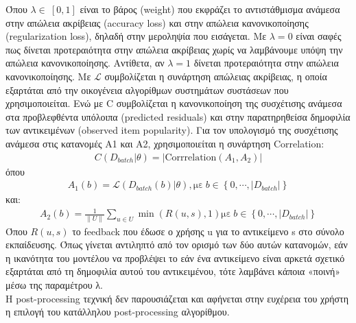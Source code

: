Όπου $ λ \in\ [0,1] $ είναι το βάρος (weight) που εκφράζει το αντιστάθμισμα ανάμεσα στην απώλεια ακρίβειας (accuracy loss) και στην απώλεια κανονικοποίησης (regularization loss), δηλαδή στην μεροληψία που εισάγεται. Με $ λ=0 $ είναι σαφές πως δίνεται προτεραιότητα στην απώλεια ακρίβειας χωρίς να λαμβάνουμε υπόψη την απώλεια κανονικοποίησης. Αντίθετα, αν $ λ=1 $ δίνεται προτεραιότητα στην απώλεια κανονικοποίησης.
Με $ \mathcal{L} $ συμβολίζεται η συνάρτηση απώλειας ακρίβειας, η οποία εξαρτάται από την οικογένεια αλγορίθμων συστημάτων συστάσεων που χρησιμοποιείται. Ενώ με C συμβολίζεται η κανονικοποίηση  της συσχέτισης ανάμεσα στα προβλεφθέντα υπόλοιπα (predicted residuals) και στην παρατηρηθείσα δημοφιλία των αντικειμένων (observed item popularity).
Για τον υπολογισμό της συσχέτισης ανάμεσα στις κατανομές A1 και A2, χρησιμοποιείται η συνάρτηση Correlation:
\begin{align}
	C\left( D_{batch} |\theta \right) = | \text{Corrrelation}(A_1, A_2) |
\end{align}
όπου
\begin{align}
	A_1(b) = \mathcal{L}\left( D_{batch}(b) |\theta \right), \text{με} \  b \in \left\lbrace 0,\cdots,|D_{batch}| \right\rbrace 
	\end{align}
και:
\begin{align}
	A_2(b) = \frac{1}{\|U\|} \sum_{u \in U} \min\left(R(u,s), 1 \right)  \text{με} \ b \in \left\lbrace 0,\cdots,|D_{batch}| \right\rbrace 
\end{align}
Όπου $ R(u, s) $ το feedback που έδωσε ο χρήσης u για το αντικείμενο s στο σύνολο εκπαίδευσης. Όπως γίνεται αντιληπτό από τον ορισμό των δύο αυτών κατανομών, εάν η ικανότητα του μοντέλου να προβλέψει το εάν ένα αντικείμενο είναι αρκετά σχετικό εξαρτάται από τη δημοφιλία αυτού του αντικειμένου, τότε λαμβάνει κάποια «ποινή» μέσω της παραμέτρου λ.\\
Η post-processing τεχνική δεν παρουσιάζεται και αφήνεται στην ευχέρεια του χρήστη η επιλογή του κατάλληλου post-processing αλγορίθμου.